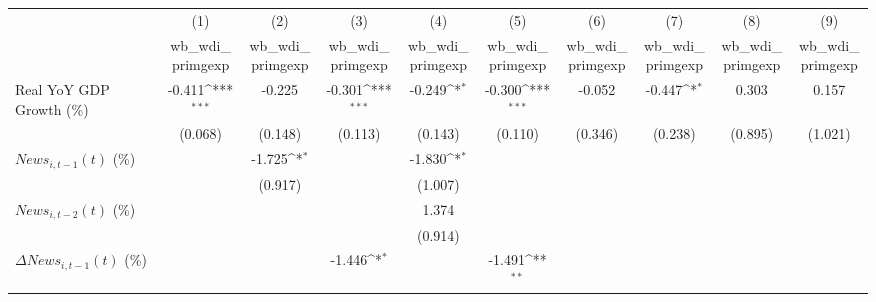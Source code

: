 {
\def\sym#1{\ifmmode^{#1}\else\(^{#1}\)\fi}
\begin{tabular}{l*{9}{c}}
\toprule
                    &\multicolumn{1}{c}{(1)}&\multicolumn{1}{c}{(2)}&\multicolumn{1}{c}{(3)}&\multicolumn{1}{c}{(4)}&\multicolumn{1}{c}{(5)}&\multicolumn{1}{c}{(6)}&\multicolumn{1}{c}{(7)}&\multicolumn{1}{c}{(8)}&\multicolumn{1}{c}{(9)}\\
                    &\multicolumn{1}{c}{wb_wdi_primgexp}&\multicolumn{1}{c}{wb_wdi_primgexp}&\multicolumn{1}{c}{wb_wdi_primgexp}&\multicolumn{1}{c}{wb_wdi_primgexp}&\multicolumn{1}{c}{wb_wdi_primgexp}&\multicolumn{1}{c}{wb_wdi_primgexp}&\multicolumn{1}{c}{wb_wdi_primgexp}&\multicolumn{1}{c}{wb_wdi_primgexp}&\multicolumn{1}{c}{wb_wdi_primgexp}\\
\midrule
Real YoY GDP Growth (\%)&      -0.411\sym{***}&      -0.225         &      -0.301\sym{***}&      -0.249\sym{*}  &      -0.300\sym{***}&      -0.052         &      -0.447\sym{*}  &       0.303         &       0.157         \\
                    &     (0.068)         &     (0.148)         &     (0.113)         &     (0.143)         &     (0.110)         &     (0.346)         &     (0.238)         &     (0.895)         &     (1.021)         \\
\addlinespace
$ News_{i,t-1}(t)$ (\%)&                     &      -1.725\sym{*}  &                     &      -1.830\sym{*}  &                     &                     &                     &                     &                     \\
                    &                     &     (0.917)         &                     &     (1.007)         &                     &                     &                     &                     &                     \\
\addlinespace
$ News_{i,t-2}(t)$ (\%)&                     &                     &                     &       1.374         &                     &                     &                     &                     &                     \\
                    &                     &                     &                     &     (0.914)         &                     &                     &                     &                     &                     \\
\addlinespace
$ \Delta News_{i,t-1}(t)$ (\%)&                     &                     &      -1.446\sym{*}  &                     &      -1.491\sym{**} &                     &                     &                     &                     \\

\end{tabular}}
